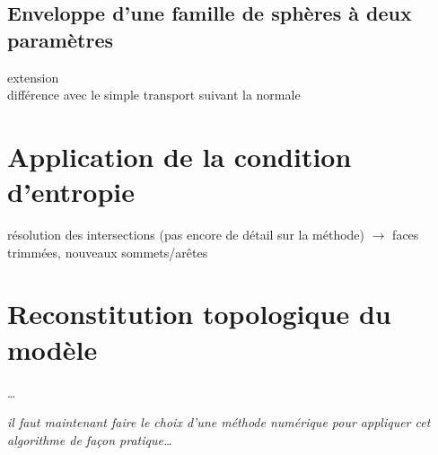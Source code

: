 \subsection{Enveloppe d'une famille de sphères à deux paramètres}
extension  \cite{gelston1995}\\
différence avec le simple transport suivant la normale \cite{jiao2001}


\section{Application de la condition d'entropie}
résolution des intersections (pas encore de détail sur la méthode) $\to$ faces trimmées, nouveaux sommets/arêtes

\section{Reconstitution topologique du modèle \brep}
\cite{peternell1997}
\ldots


\bigskip
\textit{il faut maintenant faire le choix d'une méthode numérique pour appliquer cet algorithme de façon pratique\ldots}